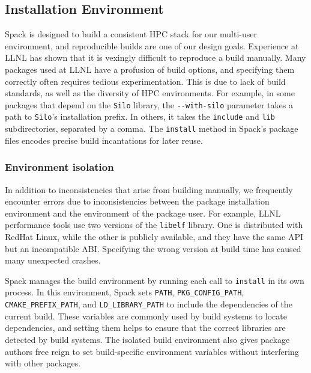 
\subsection{Installation Environment}

Spack is designed to build a consistent HPC stack for our multi-user
environment, and reproducible builds are one of our design goals.
Experience at LLNL has shown that it is vexingly difficult to reproduce
a build manually.
%
Many packages used at LLNL have a profusion of build options, and specifying
them correctly often requires tedious experimentation.  This is due to lack of
build standards, as well as the diversity of HPC environments.
For example, in some packages that depend on the {\tt Silo} library,
the \verb|--with-silo| parameter takes a path to {\tt Silo}'s installation prefix.
In others, it takes the {\tt include} and {\tt lib} subdirectories,
separated by a comma.
The {\tt install} method in Spack's package files encodes precise build
incantations for later reuse.

\subsubsection{Environment isolation}
In addition to inconsistencies that arise from building manually, we
frequently encounter errors due to inconsistencies between the package
installation environment and the environment of the package user.
%
For example, LLNL performance tools use two versions of the {\tt libelf}
library. One is distributed with RedHat Linux, while the
other is publicly available, and they have the same API but an incompatible ABI.
Specifying the wrong version at build time has caused many
unexpected crashes.

Spack manages the build environment by running each call to {\tt install}
in its own process.  In this environment, Spack sets
{\tt PATH}, {\tt PKG\_CONFIG\_PATH}, {\tt CMAKE\_PREFIX\_PATH}, and
{\tt LD\_LIBRARY\_PATH} to include the dependencies of the current build.
These variables are commonly used by build systems to locate dependencies,
and setting them helps to ensure that the correct libraries are detected by
build systems.
The isolated build environment also gives package authors
free reign to set build-specific environment variables without interfering
with other packages.


